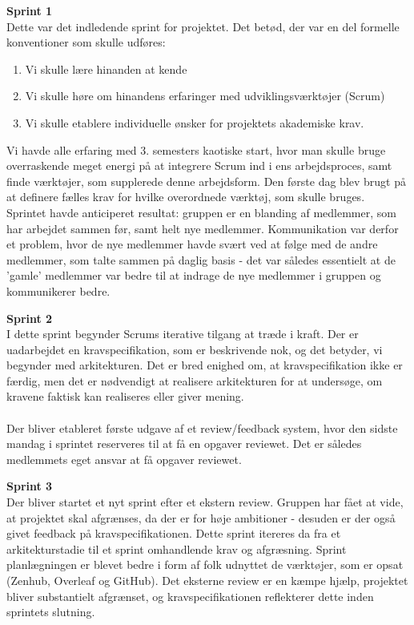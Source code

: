 \documentclass[a4paper,12pt,fleqn,oneside]{article}
\begin{document}
\textbf{Sprint 1}\\
Dette var det indledende sprint for projektet. Det betød, der var en del formelle konventioner som skulle udføres:
\begin{enumerate}
    \item Vi skulle lære hinanden at kende
    \item Vi skulle høre om hinandens erfaringer med udviklingsværktøjer (Scrum) 
    \item Vi skulle etablere individuelle ønsker for projektets akademiske krav. 
\end{enumerate}
Vi havde alle erfaring med 3. semesters kaotiske start, hvor man skulle bruge overraskende meget energi på at integrere Scrum ind i ens arbejdsproces, samt finde værktøjer, som supplerede denne arbejdsform. Den første dag blev brugt på at definere fælles krav for hvilke overordnede værktøj, som skulle bruges. \\
Sprintet havde anticiperet resultat: gruppen er en blanding af medlemmer, som har arbejdet sammen før, samt helt nye medlemmer. Kommunikation var derfor et problem, hvor de nye medlemmer havde svært ved at følge med de andre medlemmer, som talte sammen på daglig basis - det var således essentielt at de 'gamle' medlemmer var bedre til at indrage de nye medlemmer i gruppen og kommunikerer bedre. 

\textbf{Sprint 2} \\
I dette sprint begynder Scrums iterative tilgang at træde i kraft. Der er uadarbejdet en kravspecifikation, som er beskrivende nok, og det betyder, vi begynder med arkitekturen. Det er bred enighed om, at kravspecifikation ikke er færdig, men det er nødvendigt at realisere arkitekturen for at undersøge, om kravene faktisk kan realiseres eller giver mening.\\\\
Der bliver etableret første udgave af et review/feedback system, hvor den sidste mandag i sprintet reserveres til at få en opgaver reviewet. Det er således medlemmets eget ansvar at få opgaver reviewet. 

\textbf{Sprint 3} \\
Der bliver startet et nyt sprint efter et ekstern review. Gruppen har fået at vide, at projektet skal afgrænses, da der er for høje ambitioner - desuden er der også givet feedback på kravspecifikationen. Dette sprint itereres da fra et arkitekturstadie til et sprint omhandlende krav og afgræsning. Sprint planlægningen er blevet bedre i form af folk udnyttet de værktøjer, som er opsat (Zenhub, Overleaf og GitHub). Det eksterne review er en kæmpe hjælp, projektet bliver substantielt afgrænset, og kravspecifikationen reflekterer dette inden sprintets slutning.  
\end{document}
